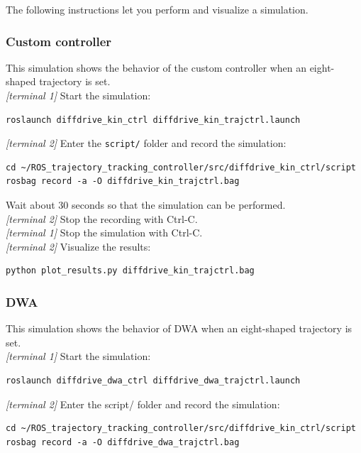 \documentclass[11pt,a4paper]{article}
\begin{document}
The following instructions let you perform and visualize a simulation.

\subsubsection{Custom controller}

This simulation shows the behavior of the custom controller when an eight-shaped trajectory is set.\\

\textit{[terminal 1]} Start the simulation:
\begin{lstlisting}
roslaunch diffdrive_kin_ctrl diffdrive_kin_trajctrl.launch
\end{lstlisting}


\textit{[terminal 2]} Enter the \texttt{script/} folder and record the simulation:
\begin{lstlisting}
cd ~/ROS_trajectory_tracking_controller/src/diffdrive_kin_ctrl/script
rosbag record -a -O diffdrive_kin_trajctrl.bag
\end{lstlisting}

Wait about 30 seconds so that the simulation can be performed.\\

\textit{[terminal 2]} Stop the recording with Ctrl-C.\\

\textit{[terminal 1]} Stop the simulation with Ctrl-C.\\

\textit{[terminal 2]} Visualize the results:
\begin{lstlisting}
python plot_results.py diffdrive_kin_trajctrl.bag
\end{lstlisting}

\subsubsection{DWA}

This simulation shows the behavior of DWA when an eight-shaped trajectory is set.\\

\textit{[terminal 1]} Start the simulation:
\begin{lstlisting}
roslaunch diffdrive_dwa_ctrl diffdrive_dwa_trajctrl.launch
\end{lstlisting}

\textit{[terminal 2]} Enter the script/ folder and record the simulation:
\begin{lstlisting}
cd ~/ROS_trajectory_tracking_controller/src/diffdrive_kin_ctrl/script
rosbag record -a -O diffdrive_dwa_trajctrl.bag
\end{lstlisting}
\end{document}

